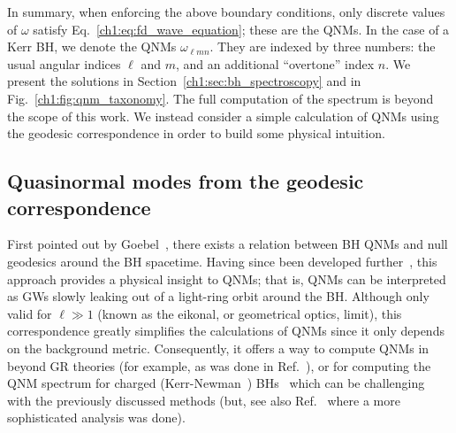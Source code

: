 In summary, when enforcing the above boundary conditions, only discrete values of $\omega$ satisfy Eq.~\ref{ch1:eq:fd_wave_equation}; these are the QNMs.
In the case of a Kerr BH, we denote the QNMs $\omega_{\ell m n}$.
They are indexed by three numbers: the usual angular indices $\ell$ and $m$, and an additional ``overtone'' index $n$.
We present the solutions in Section~\ref{ch1:sec:bh_spectroscopy} and in Fig.~\ref{ch1:fig:qnm_taxonomy}.
The full computation of the spectrum is beyond the scope of this work.
We instead consider a simple calculation of QNMs using the geodesic correspondence in order to build some physical intuition.

\subsection{Quasinormal modes from the geodesic correspondence}
\label{ch1:sec:geodesic}

First pointed out by Goebel~\cite{1972ApJ...172L..95G}, there exists a relation between BH QNMs and null geodesics around the BH spacetime.
Having since been developed further~\cite{BLOME1984231, Ferrari:1984ozr, Ferrari:1984zz, Cardoso:2008bp, Yang:2012he}, this approach provides a physical insight to QNMs; that is, QNMs can be interpreted as GWs slowly leaking out of a light-ring orbit around the BH. 
Although only valid for $\ell \gg 1$ (known as the eikonal, or geometrical optics, limit), this correspondence greatly simplifies the calculations of QNMs since it only depends on the background metric.
Consequently, it offers a way to compute QNMs in beyond GR theories (for example, as was done in Ref.~\cite{Blazquez-Salcedo:2016enn}), or for computing the QNM spectrum for charged (Kerr-Newman~\cite{Newman:1965my}) BHs~\cite{Cardoso:2016olt, Wang:2021uuh} which can be challenging with the previously discussed methods (but, see also Ref.~\cite{Carullo:2021oxn} where a more sophisticated analysis was done).


